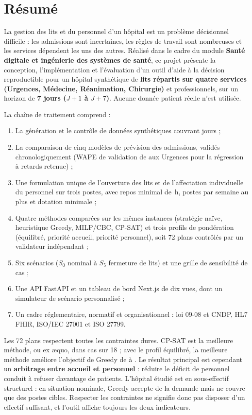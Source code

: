 \chapter*{Résumé}

La gestion des lits et du personnel d'un hôpital est un problème décisionnel difficile : les admissions sont incertaines, les règles de travail sont nombreuses et les services dépendent les uns des autres. Réalisé dans le cadre du module \textbf{Santé digitale et ingénierie des systèmes de santé}, ce projet présente la conception, l'implémentation et l'évaluation d'un outil d'aide à la décision reproductible pour un hôpital synthétique de \textbf{\NbLits{} lits répartis sur quatre services (Urgences, Médecine, Réanimation, Chirurgie)} et \NbAgents{} professionnels, sur un horizon de \textbf{7 jours ($J+1$ à $J+7$)}. Aucune donnée patient réelle n'est utilisée.

La chaîne de traitement comprend :
\begin{enumerate}
    \item La génération et le contrôle de données synthétiques couvrant \NbJours{} jours ;
    \item La comparaison de cinq modèles de prévision des admissions, validés chronologiquement (WAPE de validation de \WapeValUrg{} aux Urgences pour la régression à retards retenue) ;
    \item Une formulation unique de l'ouverture des lits et de l'affectation individuelle du personnel sur trois postes, avec repos minimal de \ReposMin{}\,h, \PostesMax{} postes par semaine au plus et dotation minimale ;
    \item Quatre méthodes comparées sur les mêmes instances (stratégie naïve, heuristique Greedy, MILP/CBC, CP-SAT) et trois profils de pondération (équilibré, priorité accueil, priorité personnel), soit 72 plans contrôlés par un validateur indépendant ;
    \item Six scénarios ($S_0$ nominal à $S_5$ fermeture de lits) et une grille de sensibilité de \NbCas{} cas ;
    \item Une API FastAPI et un tableau de bord Next.js de dix vues, dont un simulateur de scénario personnalisé ;
    \item Un cadre réglementaire, normatif et organisationnel : loi 09-08 et CNDP, HL7 FHIR, ISO/IEC 27001 et ISO 27799.
\end{enumerate}

Les 72 plans respectent toutes les contraintes dures. CP-SAT est la meilleure méthode, ou ex æquo, dans \NbCpMeilleur{} cas sur 18 ; avec le profil équilibré, la meilleure méthode améliore l'objectif de Greedy de \GainMinEq{} à \GainMaxEq{}. Le résultat principal est cependant un \textbf{arbitrage entre accueil et personnel} : réduire le déficit de personnel conduit à refuser davantage de patients. L'hôpital étudié est en sous-effectif structurel : en situation nominale, Greedy accepte \CouvDemSzGreedy{} de la demande mais ne couvre que \CouvSzGreedy{} des postes cibles. Respecter les contraintes ne signifie donc pas disposer d'un effectif suffisant, et l'outil affiche toujours les deux indicateurs.

